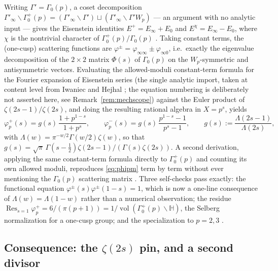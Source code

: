 \documentclass[11pt]{article}
\theoremstyle{definition}
\theoremstyle{remark}
\newcommand{\HH}{\mathbb{H}}
\begin{document}
Writing $\Gamma' = \Gamma_0(p)$, a coset decomposition
$\Gamma'_\infty\backslash\Gamma_0^+(p) =
(\Gamma'_\infty\backslash\Gamma') \sqcup
(\Gamma'_\infty\backslash\Gamma'W_p)$ --- an argument with no analytic
input --- gives the Eisenstein identities
$E^+ = E_\infty + E_0$ and $E^\chi = E_\infty - E_0$, where $\chi$ is
the nontrivial character of $\Gamma_0^+(p)/\Gamma_0(p)$
\cite[\S2.2--2.3]{M1F}. Taking constant terms, the (one-cusp)
scattering functions are $\varphi^{\pm} = \varphi_{\infty\infty} \pm
\varphi_{\infty 0}$, i.e.\ exactly the eigenvalue decomposition of the
$2\times 2$ matrix $\Phi(s)$ of $\Gamma_0(p)$ on the $W_p$-symmetric and
antisymmetric vectors. Evaluating the allowed-moduli constant-term
formula for the Fourier expansion of Eisenstein series (the single
analytic import, taken at content level from Iwaniec
\cite{IwaniecGSM53} and Hejhal \cite{HejhalLNM1001}; the equation
numbering is deliberately not asserted here, see
Remark~\ref{rem:mechscope}) against the Euler product of
$\zeta(2s-1)/\zeta(2s)$, and doing the resulting rational algebra in
$X = p^s$, yields \cite[\S3--4]{M1F}
\begin{equation}
\label{eq:phipm}
\varphi^+_p(s) = g(s)\,\frac{1 + p^{1-s}}{1+p^s},
\qquad
\varphi^-_p(s) = g(s)\,\frac{p^{1-s}-1}{p^s-1},
\qquad
g(s) := \frac{\Lambda(2s-1)}{\Lambda(2s)},
\end{equation}
with $\Lambda(w) = \pi^{-w/2}\Gamma(w/2)\zeta(w)$, so that
$g(s) = \sqrt{\pi}\,\Gamma(s-\tfrac12)\zeta(2s-1)/
(\Gamma(s)\zeta(2s))$. A second derivation, applying the same
constant-term formula directly to $\Gamma_0^+(p)$ and counting its own
allowed moduli, reproduces \eqref{eq:phipm} term by term without ever
mentioning the $\Gamma_0(p)$ scattering matrix
\cite[\S3.5]{M1F}. Three self-checks pass exactly: the functional
equation $\varphi^{\pm}(s)\varphi^{\pm}(1-s) = 1$, which is now a
one-line consequence of $\Lambda(w) = \Lambda(1-w)$ rather than a
numerical observation; the residue
$\operatorname{Res}_{s=1}\varphi^+_p = 6/(\pi(p+1)) =
1/\operatorname{vol}(\Gamma_0^+(p)\backslash\HH)$, the Selberg
normalization for a one-cusp group; and the specialization to $p=2,3$
\cite[\S4.1--4.4]{M1F}.

\subsection{Consequence: the $\zeta(2s)$ pin, and a second divisor}
\end{document}

